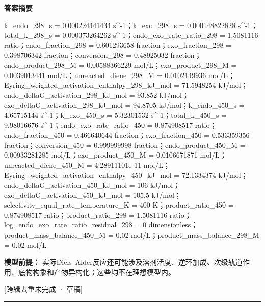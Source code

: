 \documentclass[UTF8,11pt,a4paper]{ctexart}
\begin{document}
\noindent\textbf{答案摘要}\par
k\_endo\_298\_s = 0.000224441434 s\textasciicircum{}-1；k\_exo\_298\_s = 0.000148822828 s\textasciicircum{}-1；total\_k\_298\_s = 0.000373264262 s\textasciicircum{}-1；endo\_exo\_rate\_ratio\_298 = 1.5081116 ratio；endo\_fraction\_298 = 0.601293658 fraction；exo\_fraction\_298 = 0.398706342 fraction；conversion\_298 = 0.48925032 fraction；endo\_product\_298\_M = 0.00588366229 mol/L；exo\_product\_298\_M = 0.0039013441 mol/L；unreacted\_diene\_298\_M = 0.0102149936 mol/L；Eyring\_weighted\_activation\_enthalpy\_298\_kJ\_mol = 71.5948254 kJ/mol；endo\_deltaG\_activation\_298\_kJ\_mol = 93.852 kJ/mol；exo\_deltaG\_activation\_298\_kJ\_mol = 94.8705 kJ/mol；k\_endo\_450\_s = 4.65715144 s\textasciicircum{}-1；k\_exo\_450\_s = 5.32301532 s\textasciicircum{}-1；total\_k\_450\_s = 9.98016676 s\textasciicircum{}-1；endo\_exo\_rate\_ratio\_450 = 0.874908517 ratio；endo\_fraction\_450 = 0.466640644 fraction；exo\_fraction\_450 = 0.533359356 fraction；conversion\_450 = 0.999999998 fraction；endo\_product\_450\_M = 0.00933281285 mol/L；exo\_product\_450\_M = 0.0106671871 mol/L；unreacted\_diene\_450\_M = 4.28911101e-11 mol/L；Eyring\_weighted\_activation\_enthalpy\_450\_kJ\_mol = 72.1334374 kJ/mol；endo\_deltaG\_activation\_450\_kJ\_mol = 106 kJ/mol；exo\_deltaG\_activation\_450\_kJ\_mol = 105.5 kJ/mol；selectivity\_equal\_rate\_temperature\_K = 400 K；product\_ratio\_450 = 0.874908517 ratio；product\_ratio\_298 = 1.5081116 ratio；log\_endo\_exo\_rate\_ratio\_residual\_298 = 0 dimensionless；product\_mass\_balance\_450\_M = 0.02 mol/L；product\_mass\_balance\_298\_M = 0.02 mol/L\par
\noindent\textbf{模型前提：}
实际Diels–Alder反应还可能涉及溶剂活度、逆环加成、次级轨道作用、底物构象和产物异构化；这些均不在理想模型内。\par
\noindent\textcolor{red!65!black}{[跨辑去重未完成 · 草稿]} \par
\medskip\hrule\medskip
{}
\end{document}
